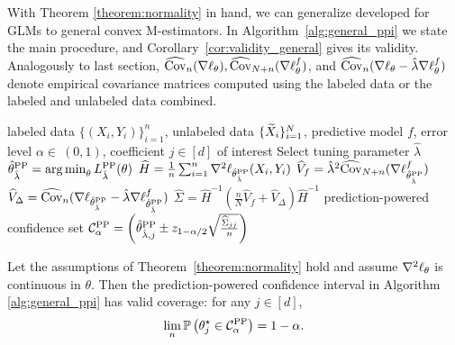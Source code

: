 With Theorem \ref{theorem:normality} in hand, we can generalize \ppipp developed for GLMs to general convex
M-estimators. In Algorithm~\ref{alg:general_ppi} we state the main
procedure, and Corollary~\ref{cor:validity_general} gives its validity.
Analogously to last section, $\widehat{\mathrm{Cov}}_n(\nabla
\ell_{\theta}),\widehat{\mathrm{Cov}}_{N+n}(\nabla \ell^f_{\theta})$, and
$\widehat{\mathrm{Cov}}_n(\nabla \ell_{\theta} - \hat \lambda \nabla
\ell_{\theta}^f)$ denote empirical covariance matrices computed using the
labeled data or the labeled and unlabeled data combined.


\begin{algorithm}[t]
\caption{\ppipp: Prediction-powered inference for general M-estimators}
\label{alg:general_ppi}
\begin{algorithmic}[1]
  \Require labeled data $\{(X_i, Y_i)\}_{i=1}^n$, unlabeled data
  $\{\widetilde X_i\}_{i=1}^N$, predictive model $f$, error level $\alpha\in~(0,1)$,
  coefficient $j\in[d]$ of interest
  \State Select tuning parameter $\hat\lambda$
  \State $\hat{\theta}^{\mathrm{PP}}_{\hat\lambda} = \operatorname*{arg\,min}_\theta L^{\mathrm{PP}}_{\hat\lambda}(\theta)$
  \State $\widehat H = \frac{1}{n} \sum_{i=1}^n \nabla^2 \ell_{\hat{\theta}^{\mathrm{PP}}_{\hat\lambda}}(X_i, Y_i)$
  \State $\widehat V_f = \hat \lambda^2 \widehat{\mathrm{Cov}}_{N+n} (\nabla \ell_{\hat{\theta}^{\mathrm{PP}}_{\hat\lambda}}^f)$ 
  \State $\widehat V_\Delta = \widehat{\mathrm{Cov}}_{n} (\nabla \ell_{\hat{\theta}^{\mathrm{PP}}_{\hat\lambda}} - \hat\lambda \nabla \ell_{\hat{\theta}^{\mathrm{PP}}_{\hat\lambda}}^f)$ 
  \State $\widehat\Sigma = \widehat H^{-1}( \frac{n}{N} \widehat V_f + \widehat V_\Delta) \widehat H^{-1}$ 
  \Ensure 
  prediction-powered confidence set $\mathcal{C}^{\mathrm{PP}}_\alpha = \left(\hat{\theta}^{\mathrm{PP}}_{\hat\lambda, j} \pm z_{1-\alpha/2} \sqrt{\frac{\widehat\Sigma_{jj}}{n}} \right)$
\end{algorithmic}
\end{algorithm}


\begin{corollary}
  \label{cor:validity_general}
  Let the assumptions of Theorem~\ref{theorem:normality} hold and
  assume $\nabla^2 \ell_\theta$ is continuous in $\theta$.
  Then the
  prediction-powered confidence interval in Algorithm \ref{alg:general_ppi}
  has valid coverage: for any $j \in [d]$,
  \begin{equation*}
    \lim_{n} \mathbb{P}\left(\theta^\star_j \in \mathcal{C}^{\mathrm{PP}}_\alpha \right) = 1-\alpha.
  \end{equation*}
\end{corollary}

